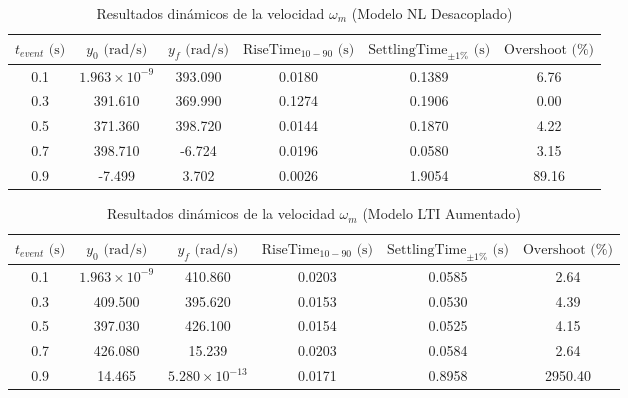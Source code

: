 \documentclass[blue,fullpaper]{ludusofficial}  %
\begin{document}
\begin{table}[htbp]
\centering
\caption{Resultados dinámicos de la velocidad $\omega_m$ (Modelo NL Desacoplado)}
\begin{tabular}{|c|c|c|c|c|c|}
\hline
$t_{event}\text{ (s)}$ & $y_0\text{ (rad/s)}$ & $y_f\text{ (rad/s)}$ & $\text{RiseTime}_{10-90}\text{ (s)}$ & $\text{SettlingTime}_{\pm 1\%}\text{ (s)}$ & $\text{Overshoot (\%)} $ \\
\hline
0.1 & $1.963 \times 10^{-9}$ & 393.090  & 0.0180 & 0.1389 & 6.76  \\
\hline
0.3 & 391.610                & 369.990  & 0.1274 & 0.1906 & 0.00  \\
\hline
0.5 & 371.360                & 398.720  & 0.0144 & 0.1870 & 4.22  \\
\hline
0.7 & 398.710                & -6.724   & 0.0196 & 0.0580 & 3.15  \\
\hline
0.9 & -7.499                 & 3.702    & 0.0026 & 1.9054 & 89.16 \\
\hline
\end{tabular}
\label{tab:dinamica_wm_NL}
\end{table}
\FloatBarrier
\begin{table}[htbp]
\centering
\caption{Resultados dinámicos de la velocidad $\omega_m$ (Modelo LTI Aumentado)}
\begin{tabular}{|c|c|c|c|c|c|}
\hline
$t_{event}\text{ (s)}$ & $y_0\text{ (rad/s)}$ & $y_f\text{ (rad/s)}$ & $\text{RiseTime}_{10-90}\text{ (s)}$ & $\text{SettlingTime}_{\pm 1\%}\text{ (s)}$ & $\text{Overshoot (\%)} $ \\
\hline
0.1 & $1.963 \times 10^{-9}$ & 410.860                & 0.0203 & 0.0585 & 2.64    \\
\hline
0.3 & 409.500                & 395.620                & 0.0153 & 0.0530 & 4.39    \\
\hline
0.5 & 397.030                & 426.100                & 0.0154 & 0.0525 & 4.15    \\
\hline
0.7 & 426.080                & 15.239                 & 0.0203 & 0.0584 & 2.64    \\
\hline
0.9 & 14.465                 & $5.280 \times 10^{-13}$ & 0.0171 & 0.8958 & 2950.40 \\
\hline
\end{tabular}
\label{tab:dinamica_wm_LTI}
\end{table}
\end{document}
